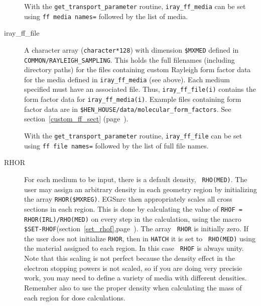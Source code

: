 \begin{description}
With the {\tt get\_transport\_parameter} routine, {\tt iray\_ff\_media} can
be set using {\tt ff media names=} followed by the list of media.

\item[iray\_ff\_file] A character array ({\tt character*128}) with
dimension {\tt \$MXMED} defined in\\
{\tt COMMON/RAYLEIGH\_SAMPLING}.  This holds the full filenames
(including directory paths) for the files containing custom Rayleigh
form factor data for the media defined in {\tt iray\_ff\_media} (see above).
Each medium specified must have an associated file.  Thus,
{\tt iray\_ff\_file(i)} contains the form factor data for
{\tt iray\_ff\_media(i)}.  Example files containing form factor data are
in {\tt \$HEN\_HOUSE/data/molecular\_form\_factors}. See
section~\ref{custom_ff_sect} (page~\pageref{custom_ff_sect}).

With the {\tt get\_transport\_parameter} routine, {\tt iray\_ff\_file} can
be set using {\tt ff file names=} followed by the list of full file names.

\label{RHOF_RHOR}
\item[RHOR] For each medium to be input, there is a default density, {\tt
RHO(MED)}.  The user may assign an arbitrary density in each geometry
region by initializing the array {\tt RHOR(\$MXREG)}.  EGSnrc then
appropriately scales all cross sections in each region. This is done by
calculating the value of {\tt RHOF    = RHOR(IRL)/RHO(MED)} on every step
in the calculation, using the macro {\tt
\$SET-RHOF}(section~\ref{set_rhof},page~\pageref{set_rhof}). The array {\tt
RHOR} is initially zero. If the user
does not initialize {\tt RHOR}, then in {\tt HATCH} it is set to {\tt
RHO(MED)} using the material assigned to each region. In this case {\tt
RHOF} is always unity.  Note that this scaling is not perfect because the
density effect in the electron stopping powers is not scaled, so if you are
doing very precisie work, you may need to define a variety of media with
different densities. Remember also to use the proper density when
calculating the mass of each region for dose calculations.



\end{description}
